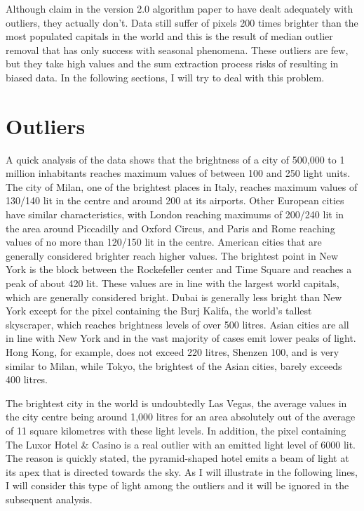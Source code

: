 Although \citeauthor{elvidge2021annual} claim in the version 2.0 algorithm paper \citep{elvidge2021annual} to have dealt adequately with outliers, they actually don't. Data still suffer of pixels 200 times brighter than the most populated capitals in the world and this is the result of median outlier removal that has only success with seasonal phenomena. These outliers are few, but they take high values and the sum extraction process risks of resulting in biased data. In the following sections, I will try to deal with this problem.
\section{Outliers}
A quick analysis of the data shows that the brightness of a city of 500,000 to 1 million inhabitants reaches maximum values of between 100 and 250 light units. The city of Milan, one of the brightest places in Italy, reaches maximum values of 130/140 lit in the centre and around 200 at its airports. Other European cities have similar characteristics, with London reaching maximums of 200/240 lit in the area around Piccadilly and Oxford Circus, and Paris and Rome reaching values of no more than 120/150 lit in the centre. American cities that are generally considered brighter reach higher values. The brightest point in New York is the block between the Rockefeller center and Time Square and reaches a peak of about 420 lit. These values are in line with the largest world capitals, which are generally considered bright. Dubai is generally less bright than New York except for the pixel containing the Burj Kalifa, the world's tallest skyscraper, which reaches brightness levels of over 500 litres. Asian cities are all in line with New York and in the vast majority of cases emit lower peaks of light. Hong Kong, for example, does not exceed 220 litres, Shenzen 100, and is very similar to Milan, while Tokyo, the brightest of the Asian cities, barely exceeds 400 litres.

The brightest city in the world is undoubtedly Las Vegas, the average values in the city centre being around 1,000 litres for an area absolutely out of the average of 11 square kilometres with these light levels. In addition, the pixel containing The Luxor Hotel & Casino is a real outlier with an emitted light level of 6000 lit. The reason is quickly stated, the pyramid-shaped hotel emits a beam of light at its apex that is directed towards the sky. As I will illustrate in the following lines, I will consider this type of light among the outliers and it will be ignored in the subsequent analysis. 

